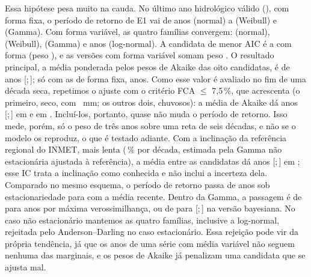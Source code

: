 \documentclass[11pt,a4paper]{article}
\newcommand{\IC}[2]{[#1;\,#2]}            %
\begin{document}
Essa hipótese pesa muito na cauda. No último ano hidrológico válido (\UltimoAnoNS), com forma
fixa, o período de retorno de E1 vai de \TNSNormal{} anos (normal) a \TNSWeibull{} (Weibull) e
\TNSGamma{} (Gamma). Com forma variável, as quatro famílias convergem: \TNSNormalVar{} (normal),
\TNSWeibullVar{} (Weibull), \TNSGammaVar{} (Gamma) e \TNSLogNormalVar{} anos (log-normal). A
candidata de menor AIC é a \MelhorAICNS{} com forma \MelhorAICNSForma{} (peso \PesoNSNormal{}), e as
versões com forma variável somam peso \PesoNSVarTotal{}. O resultado principal, a média ponderada
pelos pesos de Akaike das oito candidatas, é de \TNSMediaUlt{} anos
\IC{\TNSMediaUltICinf}{\TNSMediaUltICsup}; só com as de forma fixa, \TNSMediaFixaUlt{} anos. Como esse
valor é avaliado no fim de uma década seca, repetimos o ajuste com o critério FCA $\le$ 7,5\,\%,
que acrescenta \AnosFCASete{} (o primeiro, seco, com \ChuvaObsOitentaUm{}~mm; os outros dois,
chuvosos): a média de Akaike dá \TNSMediaFCASeteUlt{} anos
\IC{\TNSMediaFCASeteUltICinf}{\TNSMediaFCASeteUltICsup} em \UltimoAnoFCASete{} e
\TNSMediaFCASeteUltStd{} em \UltimoAnoNS{}. Incluí-los, portanto, quase não muda o período de
retorno. Isso mede, porém, só o peso de três anos sobre uma reta de seis décadas, e não se o
modelo os reproduz, o que é testado adiante. Com a inclinação da referência regional do INMET, mais
lenta (\NSRegionalEfeito{}\,\% por década, estimada pela Gamma não estacionária ajustada à
referência), a média entre as candidatas dá \TRegionalMediaUltB{} anos
\IC{\TRegionalMediaUltBICinf}{\TRegionalMediaUltBICsup} em \UltimoAnoNS{}; esse IC trata a inclinação
como conhecida e não inclui a incerteza dela. Comparado no mesmo esquema, o período de
retorno passa de \TMediaAkaikeB{} anos sob estacionariedade para \TNSMediaUlt{} com a média
recente. Dentro da Gamma, a passagem é de \TGamma{} para \TTempoUlt{} anos por máxima
verossimilhança, ou de \TBayes{} para \TBayesNSUlt{} \IC{\TBayesNSUltICinf}{\TBayesNSUltICsup} na versão
bayesiana.
No caso não estacionário mantemos as quatro famílias, inclusive a log-normal, rejeitada pelo
Anderson--Darling no caso estacionário. Essa rejeição pode vir da própria tendência, já que os anos
de uma série com média variável não seguem nenhuma das marginais, e os pesos de Akaike já
penalizam uma candidata que se ajusta mal.
\end{document}
